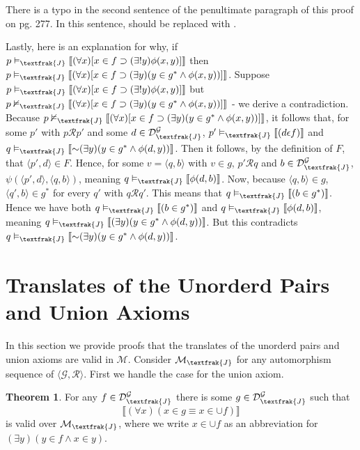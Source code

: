 \documentclass{article}
\newcommand*{\oldneg}{\mathord{\sim}}
\newcommand{\lbc}{\llbracket}
\newcommand{\rbc}{\rrbracket}
\theoremstyle{definition}
\newtheorem{theorem}{Theorem}[section]
\begin{document}
There is a typo in the second sentence of the penultimate paragraph of this proof on pg. 277. In this sentence,
 should be replaced with .

Lastly, here is an explanation for why, if $p\vDash_\textfrak{J}\lbc(\forall x)[x\in f\supset(\exists !y)\phi(x,y)]\rbc$ then
$p\vDash_\textfrak{J}\lbc(\forall x)[x\in f\supset(\exists y)(y\in g^*\wedge\phi(x,y))]\rbc$. Suppose
$p\vDash_\textfrak{J}\lbc(\forall x)[x\in f\supset(\exists !y)\phi(x,y)]\rbc$ but
$p\nvDash_\textfrak{J}\lbc(\forall x)[x\in f\supset(\exists y)(y\in g^*\wedge\phi(x,y))]\rbc$ - we derive a contradiction.
Because $p\nvDash_\textfrak{J}\lbc(\forall x)[x\in f\supset(\exists y)(y\in g^*\wedge\phi(x,y))]\rbc$, it follows that,
for some $p'$ with $p\mathcal{R}p'$ and some $d\in\mathcal{D}^\mathcal{G}_\textfrak{J}$,
$p'\vDash_\textfrak{J}\lbc (d\epsilon f)\rbc$ and
$q\vDash_\textfrak{J}\lbc\oldneg(\exists y)(y\in g^*\wedge\phi(d,y))\rbc$. Then it follows, by the definition of $F$, that
$\langle p',d\rangle\in F$. Hence, for some $v=\langle q,b\rangle$ with $v\in g$, $p'\mathcal{R}q$ and 
$b\in\mathcal{D}^\mathcal{G}_\textfrak{J}$, $\psi(\langle p',d\rangle,\langle q,b\rangle)$, meaning 
$q\vDash_\textfrak{J}\lbc\phi(d,b)\rbc$. Now, because $\langle q,b\rangle\in g$, 
$\langle q',b\rangle\in g^*$ for every $q'$ with $q\mathcal{R}q'$. This means that
$q\vDash_\textfrak{J}\lbc (b\in g^*)\rbc$. Hence we have both 
$q\vDash_\textfrak{J}\lbc (b\in g^*)\rbc$ and 
$q\vDash_\textfrak{J}\lbc \phi(d,b)\rbc$, meaning
$q\vDash_\textfrak{J}\lbc(\exists y)(y\in g^*\wedge\phi(d,y))\rbc$. But this contradicts
$q\vDash_\textfrak{J}\lbc\oldneg(\exists y)(y\in g^*\wedge\phi(d,y))\rbc$.

\section*{Translates of the Unorderd Pairs and Union Axioms}
In this section we provide proofs that the translates of the unorderd pairs and union axioms are 
valid in $\mathcal{M}$. Consider $\mathcal{M}_\textfrak{J}$ for any automorphism sequence  of 
$\langle\mathcal{G},\mathcal{R}\rangle$. First we handle the case for the union axiom.

\begin{theorem}
For any $f\in\mathcal{D}^\mathcal{G}_\textfrak{J}$ there is some $g\in\mathcal{D}^\mathcal{G}_\textfrak{J}$ such that
\[ \lbc(\forall x)(x\in g\equiv x\in\cup f)\rbc \] is valid over $\mathcal{M}_\textfrak{J}$, where we write 
$x\in\cup f$ as an abbreviation for $(\exists y)(y\in f\wedge x\in y)$.
\end{theorem}
\end{document}
